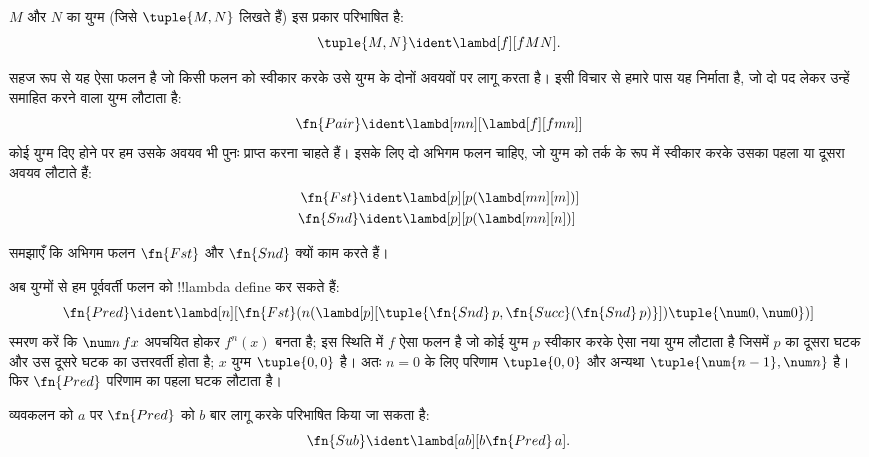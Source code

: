 \documentclass[../../../include/open-logic-section]{subfiles}
\begin{document}

\begin{defn}
$M$ और $N$ का युग्म (जिसे $\tuple{M,N}$ लिखते हैं) इस प्रकार परिभाषित है:
\[
\tuple{M,N} \ident \lambd[f][fMN].
\]
\end{defn}
  
सहज रूप से यह ऐसा फलन है जो किसी फलन को स्वीकार करके उसे युग्म के दोनों
अवयवों पर लागू करता है। इसी विचार से हमारे पास यह निर्माता है, जो दो पद
लेकर उन्हें समाहित करने वाला युग्म लौटाता है:
\[
  \fn{Pair} \ident \lambd[mn][\lambd[f][fmn]]
\]
कोई युग्म दिए होने पर हम उसके अवयव भी पुनः प्राप्त करना चाहते हैं। इसके
लिए दो अभिगम फलन चाहिए, जो युग्म को तर्क के रूप में स्वीकार करके उसका पहला
या दूसरा अवयव लौटाते हैं:
\begin{align*}
  \fn{Fst} & \ident \lambd[p][p(\lambd[mn][m])]\\
  \fn{Snd} & \ident \lambd[p][p(\lambd[mn][n])]
\end{align*}

\begin{prob}
  समझाएँ कि अभिगम फलन $\fn{Fst}$ और $\fn{Snd}$ क्यों काम करते हैं।
\end{prob}

अब युग्मों से हम पूर्ववर्ती फलन को !!{lambda define} कर सकते हैं:
\[
  \fn{Pred} \ident \lambd[n][\fn{Fst}(n (\lambd[p][\tuple{\fn{Snd}\, {p}, \fn{Succ}(\fn{Snd}\, {p})}]) \tuple{\num 0, \num 0})]
\]
स्मरण करें कि $\num n\, f x$ अपचयित होकर $f^{n}(x)$ बनता है; इस स्थिति
में $f$ ऐसा फलन है जो कोई युग्म $p$ स्वीकार करके ऐसा नया युग्म लौटाता है
जिसमें $p$ का दूसरा घटक और उस दूसरे घटक का उत्तरवर्ती होता है; $x$ युग्म
$\tuple{0,0}$ है। अतः $n=0$ के लिए परिणाम $\tuple{0,0}$ और अन्यथा
$\tuple{\num{n-1}, \num n}$ है। फिर $\fn{Pred}$ परिणाम का पहला घटक लौटाता
है।

व्यवकलन को $a$ पर $\fn{Pred}$ को $b$ बार लागू करके परिभाषित किया जा सकता है:
\[
\fn{Sub} \ident \lambd[ab][b \fn{Pred}\, a].
\]
    
\end{document}
